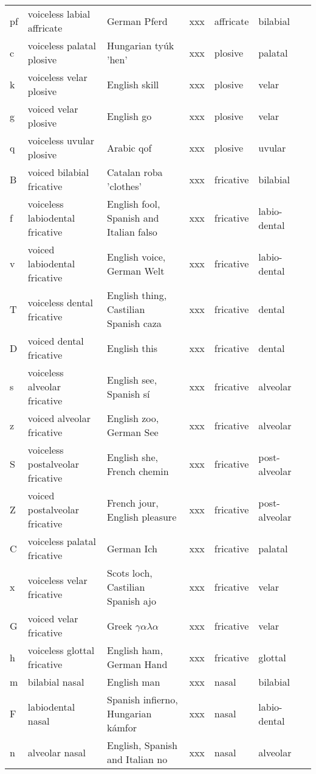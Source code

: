 \begin{longtable}{l|p{.3\linewidth}|p{.15\linewidth}|l|l|l|l}
	pf	& voiceless labial affricate	& German Pferd	& xxx	& affricate	& bilabial	\\
	c	& voiceless palatal plosive	& Hungarian tyúk 'hen'	& xxx	& plosive	& palatal	\\
	k	& voiceless velar plosive	& English skill	& xxx	& plosive	& velar	\\
	g	& voiced velar plosive	& English go	& xxx	& plosive	& velar	\\
	q	& voiceless uvular plosive	& Arabic qof	& xxx	& plosive	& uvular	\\
	B	& voiced bilabial fricative	& Catalan roba 'clothes'	& xxx	& fricative	& bilabial	\\
	f	& voiceless labiodental fricative	& English fool, Spanish and Italian falso	& xxx	& fricative	& labio-dental	\\
	v	& voiced labiodental fricative	& English voice, German Welt	& xxx	& fricative	& labio-dental	\\
	T	& voiceless dental fricative	& English thing, Castilian Spanish caza	& xxx	& fricative	& dental	\\
	D	& voiced dental fricative	& English this	& xxx	& fricative	& dental	& 	\\
	s	& voiceless alveolar fricative	& English see, Spanish sí	& xxx	& fricative	& alveolar	\\
	z	& voiced alveolar fricative	& English zoo, German See	& xxx	& fricative	& alveolar	\\
	S	& voiceless postalveolar fricative	& English she, French chemin	& xxx	& fricative	& post-alveolar	\\
	Z	& voiced postalveolar fricative	& French jour, English pleasure	& xxx	& fricative	& post-alveolar	\\
	C	& voiceless palatal fricative	& German Ich	& xxx	& fricative	& palatal	\\
	x	& voiceless velar fricative	& Scots loch, Castilian Spanish ajo	& xxx	& fricative	& velar	\\
	G	& voiced velar fricative	& Greek $\gamma\alpha\lambda\alpha$	& xxx	& fricative	& velar	\\
	h	& voiceless glottal fricative	& English ham, German Hand	& xxx	& fricative	& glottal	\\
	m	& bilabial nasal	& English man	& xxx	& nasal	& bilabial	\\
	F	& labiodental nasal	& Spanish infierno, Hungarian kámfor	& xxx	& nasal	& labio-dental	\\
	n	& alveolar nasal	& English, Spanish and Italian no	& xxx	& nasal	& alveolar	\\

\end{longtable}
